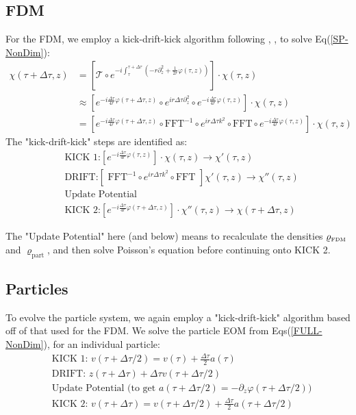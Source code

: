 \documentclass[oneside]{book}
\newcommand{\pd}{\partial}
\begin{document}
\subsection{FDM}
For the FDM, we employ a kick-drift-kick algorithm following \cite{Edwards_2018}, \cite{May&Springel_2021}, to solve Eq(\ref{SP-NonDim}):
\begin{align}
    \chi(\tau+\Delta \tau,z) & = \left[\mathcal{T} \circ e^{-i \int_\tau^{\tau+\Delta\tau} \left(-r \pd_z^2 + \frac{1}{2r}\varphi(\tau,z)\right) } \right]\cdot \chi(\tau,z) \\
    &  \approx  \left[ e^{-i\frac{\Delta\tau}{4r}\varphi(\tau+\Delta\tau,z)} \circ e^{ir\Delta\tau \pd_z^2}\circ e^{-i\frac{\Delta\tau}{4r}\varphi(\tau,z)} \right] \cdot \chi(\tau,z)\\
    & = \left[e^{-i\frac{\Delta\tau}{4r}\varphi(\tau+\Delta\tau,z)} \circ \text{FFT}^{-1}\circ e^{ir\Delta\tau k^2}\circ \text{FFT}\circ e^{-i\frac{\Delta\tau}{4r}\varphi(\tau,z)} \right] \cdot \chi(\tau,z)
\end{align}
The "kick-drift-kick" steps are identified as:
\begin{align*}
    & \text{KICK 1:}  \left[ e^{-i\frac{\Delta\tau}{4r}\varphi(\tau,z)}\right] \cdot \chi(\tau,z) \rightarrow \chi'(\tau,z) \\
    &\text{DRIFT:}  \left[\text{ FFT}^{-1}\circ e^{ir\Delta\tau k^2}\circ \text{FFT } \right] \chi'(\tau,z) \rightarrow \chi''(\tau,z) \\
    &\text{Update Potential} \\
    &\text{KICK 2:}  \left[e^{-i\frac{\Delta\tau}{4r}\varphi(\tau+\Delta\tau,z)} \right]\cdot \chi''(\tau,z) \rightarrow \chi(\tau+\Delta\tau,z)
\end{align*}

The "Update Potential" here (and below) means to recalculate the densities $\varrho_\text{\tiny{FDM}}$ and $\varrho_\text{part}$, and then solve Poisson's equation before continuing onto KICK 2.
\subsection{Particles} To evolve the particle system, we again employ a "kick-drift-kick" algorithm based off of that used for the FDM. We solve the particle EOM from Eqs(\ref{FULL-NonDim}), for an individual particle:
\begin{align*}
&\text{KICK 1: } v({\tau+\Delta\tau/2}) = v(\tau) + \frac{\Delta\tau}{2}a(\tau)\\
&\text{DRIFT: } z({\tau+\Delta\tau})+ \Delta\tau v({\tau+\Delta\tau/2})\\
&\text{Update Potential (to get $a({\tau+\Delta\tau/2}) = -\pd_z \varphi({\tau+\Delta\tau/2})$})\\
&\text{KICK 2: } v({\tau+\Delta\tau}) = v({\tau+\Delta\tau/2}) + \frac{\Delta\tau}{2}a({\tau+\Delta\tau/2})\\
\end{align*}
\end{document}
